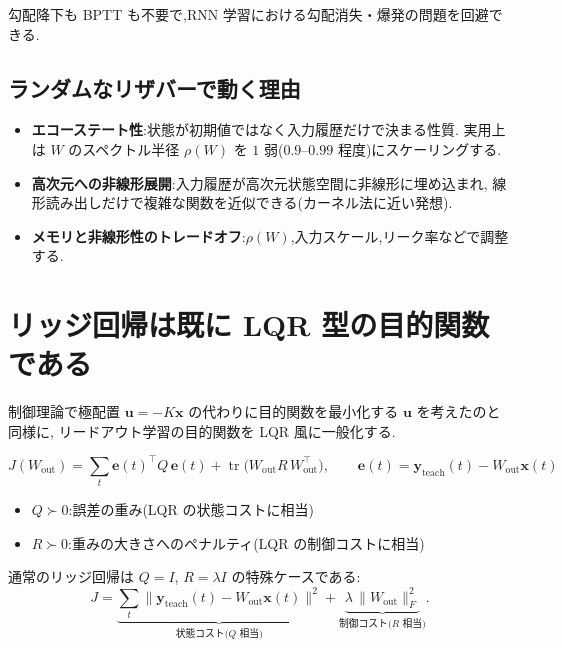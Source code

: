 \documentclass[a4paper,11pt]{ltjsarticle}
\newcommand{\Wout}{W_{\mathrm{out}}}
\newcommand{\yt}{\bm{y}_{\mathrm{teach}}}
\newcommand{\T}{^{\top}}
\newcommand{\tr}{\operatorname{tr}}
\begin{document}
勾配降下も BPTT も不要で,RNN 学習における勾配消失・爆発の問題を回避できる.

\subsection{ランダムなリザバーで動く理由}

\begin{itemize}
  \item \textbf{エコーステート性}:状態が初期値ではなく入力履歴だけで決まる性質.
        実用上は $W$ のスペクトル半径 $\rho(W)$ を $1$ 弱($0.9$--$0.99$ 程度)にスケーリングする.
  \item \textbf{高次元への非線形展開}:入力履歴が高次元状態空間に非線形に埋め込まれ,
        線形読み出しだけで複雑な関数を近似できる(カーネル法に近い発想).
  \item \textbf{メモリと非線形性のトレードオフ}:$\rho(W)$,入力スケール,リーク率などで調整する.
\end{itemize}

\section{リッジ回帰は既に LQR 型の目的関数である}

制御理論で極配置 $\bm{u} = -K\bm{x}$ の代わりに目的関数を最小化する $\bm{u}$ を考えたのと同様に,
リードアウト学習の目的関数を LQR 風に一般化する.

\begin{keybox}[title=一般化した目的関数]
\begin{equation}
  J(\Wout) = \sum_{t} \bm{e}(t)\T Q\, \bm{e}(t)
           + \tr\!\bigl(\Wout R\, \Wout\T\bigr),
  \qquad
  \bm{e}(t) = \yt(t) - \Wout\bm{x}(t)
  \label{eq:J}
\end{equation}
\end{keybox}

\begin{itemize}
  \item $Q \succ 0$:誤差の重み(LQR の状態コストに相当)
  \item $R \succ 0$:重みの大きさへのペナルティ(LQR の制御コストに相当)
\end{itemize}

通常のリッジ回帰は $Q = I$, $R = \lambda I$ の特殊ケースである:
\begin{equation}
  J = \underbrace{\sum_t \bigl\|\yt(t) - \Wout\bm{x}(t)\bigr\|^2}_{\text{状態コスト($Q$ 相当)}}
    + \underbrace{\lambda\,\|\Wout\|_F^2}_{\text{制御コスト($R$ 相当)}} .
\end{equation}
\end{document}

